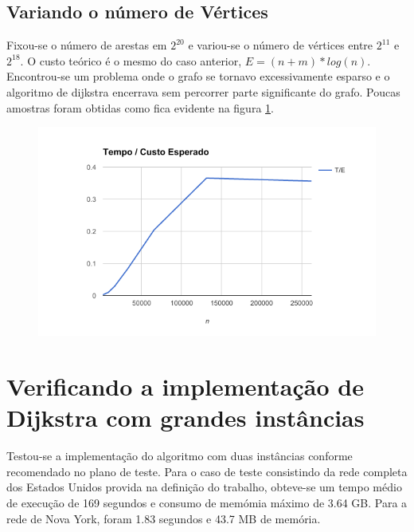 \documentclass{iiufrgs}
\begin{document}
\subsection{Variando o número de Vértices}
Fixou-se o número de arestas em $2^{20}$ e variou-se o número de vértices entre $2^{11}$ e $2^{18}$. O custo teórico é o mesmo do caso anterior, $E = (n+m)*log(n)$. Encontrou-se um problema onde o grafo se tornavo excessivamente esparso e o algoritmo de dijkstra encerrava sem percorrer parte significante do grafo. Poucas amostras foram obtidas como fica evidente na figura \ref{fig:dij_edge}.
\begin{figure}[h!]
\includegraphics[width=0.75\linewidth]{dij_fixed_edge}
\centering
\caption{}{}
\label{fig:dij_edge}
\end{figure}


\section{Verificando a implementaç\~ao de Dijkstra com grandes instâncias}
Testou-se a implementaç\~ao do algoritmo com duas instâncias conforme recomendado no plano de teste. Para o caso de teste consistindo da rede completa dos Estados Unidos provida na definiç\~ao do trabalho, obteve-se um tempo médio de execuç\~ao de 169 segundos e consumo de memómia máximo de 3.64 GB. Para a rede de Nova York, foram 1.83 segundos e 43.7 MB de memória.
\end{document}
